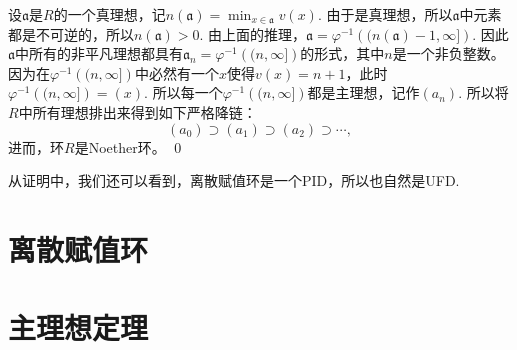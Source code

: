 	设$\mathfrak{a}$是$R$的一个真理想，记$n(\mathfrak{a})=\min_{x\in \mathfrak{a}}v(x)$. 由于是真理想，所以$\mathfrak{a}$中元素都是不可逆的，所以$n(\mathfrak{a})>0$. 由上面的推理，$\mathfrak{a}=\varphi^{-1}\left((n(\mathfrak{a})-1,\infty]\right)$. 因此$\mathfrak{a}$中所有的非平凡理想都具有$\mathfrak{a}_n=\varphi^{-1}\left((n,\infty]\right)$的形式，其中$n$是一个非负整数。因为在$\varphi^{-1}\left((n,\infty]\right)$中必然有一个$x$使得$v(x)=n+1$，此时$\varphi^{-1}\left((n,\infty]\right)=(x)$. 所以每一个$\varphi^{-1}\left((n,\infty]\right)$都是主理想，记作$(a_n)$. 所以将$R$中所有理想排出来得到如下严格降链：
	\[
		(a_0)\supset (a_1) \supset (a_2)\supset \cdots,
	\]
	进而，环$R$是Noether环。
\qed

从证明中，我们还可以看到，离散赋值环是一个PID，所以也自然是UFD.

\section{离散赋值环}
\section{主理想定理}